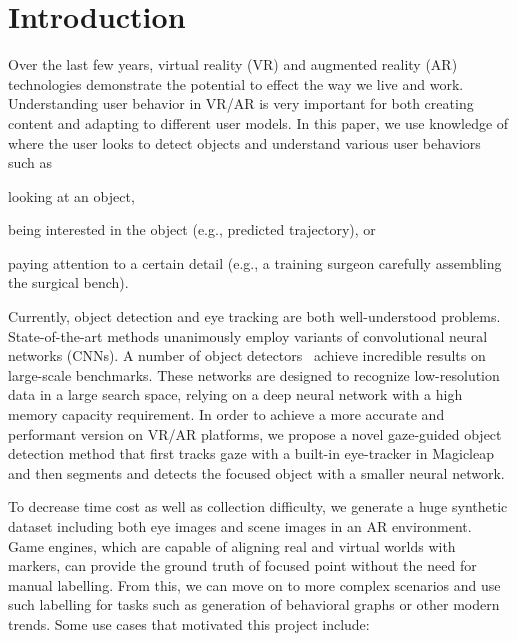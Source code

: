 \section{Introduction}

Over the last few years, virtual reality (VR) and augmented reality (AR)
technologies demonstrate the potential to effect the way we live and work.
Understanding user behavior in VR/AR is very important for both creating
content and adapting to different user models. In this paper, we use
knowledge of where the user looks to detect objects and
understand various user behaviors such as
\begin{inlist}
\item looking at an object,
\item being interested in the object (e.g., predicted trajectory), or
\item
    paying attention to a certain detail (e.g., a training surgeon carefully
    assembling the surgical bench).
\end{inlist}

Currently, object detection and eye tracking are both well-understood problems.
State-of-the-art methods unanimously employ variants of convolutional neural
networks (CNNs). A number of object detectors~\cite{redmon2016you, liu2016ssd,
lin2017focal, girshick2014rich, girshick2015fast, ren2015faster, he2017mask}
achieve incredible results on large-scale benchmarks. These networks are
designed to recognize low-resolution data in a large search space, relying on a
deep neural network with a high memory capacity requirement. In order to achieve
a more accurate and performant version on VR/AR platforms, we propose a novel
gaze-guided object detection method that first tracks gaze with a built-in
eye-tracker in Magicleap and then segments and detects the focused object with a
smaller neural network.

To decrease time cost as well as collection difficulty, we generate a huge
synthetic dataset including both eye images and scene images in an AR
environment. Game engines, which are capable of aligning real and virtual worlds
with markers, can provide the ground truth of focused point without the need for
manual labelling. From this, we can move on to more complex scenarios and use
such labelling for tasks such as generation of behavioral graphs or other
modern trends. Some use cases that motivated this project include:

